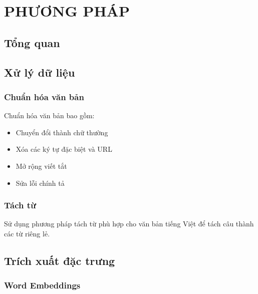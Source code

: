 \chapter{PHƯƠNG PHÁP}
\label{chap:methodology}

\section{Tổng quan}

%
%

\section{Xử lý dữ liệu}

\subsection{Chuẩn hóa văn bản}

Chuẩn hóa văn bản bao gồm:
\begin{itemize}
    \item Chuyển đổi thành chữ thường
    \item Xóa các ký tự đặc biệt và URL
    \item Mở rộng viết tắt
    \item Sửa lỗi chính tả
\end{itemize}

\subsection{Tách từ}

Sử dụng phương pháp tách từ phù hợp cho văn bản tiếng Việt để tách câu thành các từ riêng lẻ.

\section{Trích xuất đặc trưng}

\subsection{Word Embeddings}

